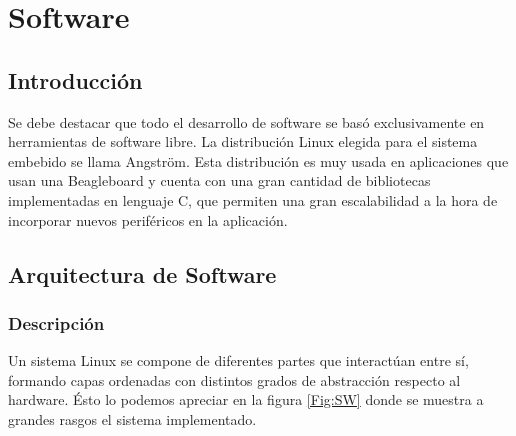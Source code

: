 \chapter{Software}

\section{Introducción}
Se debe destacar que todo el desarrollo de software se basó exclusivamente en herramientas de software libre. La distribución Linux elegida para el sistema embebido se llama Angström. Esta distribución es muy usada en aplicaciones que usan una Beagleboard y cuenta con una gran cantidad de bibliotecas implementadas en lenguaje C, que permiten una gran escalabilidad a la hora de incorporar nuevos periféricos en la aplicación.

\section{Arquitectura de Software}
\subsection{Descripción}
Un sistema Linux se compone de diferentes partes que interactúan entre sí, formando capas ordenadas con distintos grados de abstracción respecto al hardware. Ésto lo podemos apreciar en la figura \ref{Fig:SW} donde se muestra a grandes rasgos el sistema implementado. 

